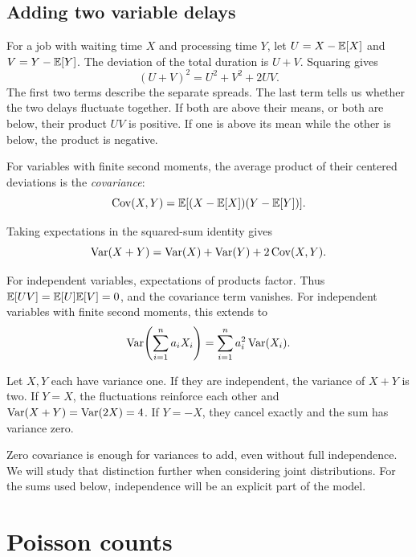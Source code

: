 \subsection{Adding two variable delays}

For a job with waiting time \(X\) and processing time \(Y\), let
\(U=X-\mathbb{E}[X]\) and \(V=Y-\mathbb{E}[Y]\). The deviation of the total
duration is \(U+V\). Squaring gives
\[
  (U+V)^2=U^2+V^2+2UV.
\]
The first two terms describe the separate spreads. The last term tells us
whether the two delays fluctuate together. If both are above their means,
or both are below, their product \(UV\) is positive. If one is above its
mean while the other is below, the product is negative.

\begin{definition}[Covariance]
For variables with finite second moments, the average product of their
centered deviations is the \emph{covariance}:
\[
  \operatorname{Cov}(X,Y)=\mathbb{E}[(X-\mathbb{E}[X])(Y-\mathbb{E}[Y])].
\]
\end{definition}
\begin{result}
Taking expectations in the squared-sum identity gives
\begin{equation}
  \operatorname{Var}(X+Y)=\operatorname{Var}(X)+\operatorname{Var}(Y)+2\operatorname{Cov}(X,Y).
  \label{eq:variance-sum}
\end{equation}
\end{result}
For independent variables, expectations of products factor. Thus
\(\mathbb{E}[UV]=\mathbb{E}[U]\mathbb{E}[V]=0\), and the covariance term vanishes.
For independent variables with finite second moments, this extends to
\[
  \operatorname{Var}\!\left(\sum_{i=1}^n a_iX_i\right)
  =\sum_{i=1}^n a_i^2\operatorname{Var}(X_i).
\]

\begin{example}
Let \(X,Y\) each have variance one. If they are independent, the variance
of \(X+Y\) is two. If \(Y=X\), the fluctuations reinforce each other and
\(\operatorname{Var}(X+Y)=\operatorname{Var}(2X)=4\). If \(Y=-X\), they cancel exactly and the sum
has variance zero.
\end{example}

Zero covariance is enough for variances to add, even without full
independence. We will study that distinction further when considering
joint distributions. For the sums used below, independence will be an
explicit part of the model.

\section{Poisson counts}
\label{sec:poisson}

